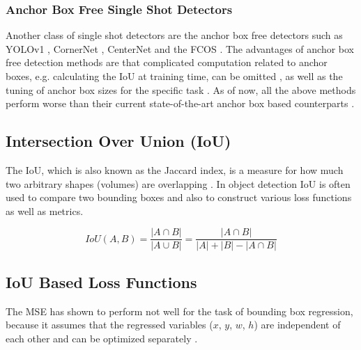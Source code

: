 

\subsubsection{Anchor Box Free Single Shot Detectors}

Another class of single shot detectors are the anchor box free detectors such as \ac{YOLOv1} \cite{yolov1}, CornerNet \cite{corner_net}, CenterNet \cite{center_net} and the \ac{FCOS} \cite{fcos}.
The advantages of anchor box free detection methods are that complicated computation related to anchor boxes, e.g. calculating the \ac{IoU} at training time, can be omitted \cite{fcos}, as well as the tuning of anchor box sizes for the specific task \cite{center_net}.
As of now, all the above methods perform worse than their current state-of-the-art anchor box based counterparts \cite{yolov4}.



\subsection{Intersection Over Union (IoU)}

The \ac{IoU}, which is also known as the Jaccard index, is a measure for how much two arbitrary shapes (volumes) are overlapping \cite{giou}.
In object detection \ac{IoU} is often used to compare two bounding boxes and also to construct various loss functions as well as metrics.

\begin{equation}
    IoU(A, B) = \frac{|A \cap B|}{|A \cup B|} = \frac{| A \cap B |}{|A| + |B| - |A \cap B|}
\end{equation}


\subsection{IoU Based Loss Functions}

The \ac{MSE} has shown to perform not well for the task of bounding box regression, because it assumes that the regressed variables ($x$, $y$, $w$, $h$) are independent of each other and can be optimized separately \cite{iou}.

